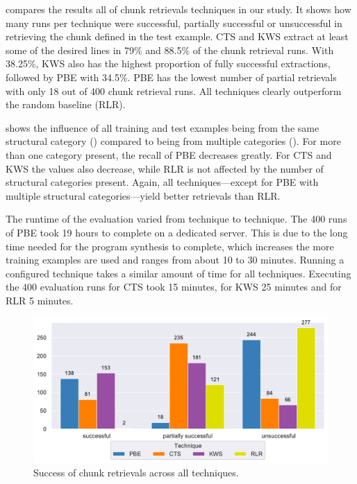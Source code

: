  compares the results all of chunk
retrievals techniques in our study.
It shows how many runs per technique were successful, partially
successful or unsuccessful in retrieving the chunk defined in the
test example.
CTS and KWS
extract at least some of the desired lines in 79\% and 88.5\%
of the chunk retrieval runs.
With 38.25\%, KWS also has the highest proportion of fully
successful extractions, followed by PBE with 34.5\%.
PBE has the
lowest number of partial retrievals with only 18 out of 400 chunk
retrieval runs.
All techniques clearly outperform the random baseline (RLR).

shows the influence of all training and test examples being from the
same structural category
()
compared to being from multiple categories
().
For more
than one category present, the recall of PBE decreases greatly.
For CTS and KWS the values also decrease, while RLR is not affected by
the number of structural categories present.
Again, all techniques---except for PBE with multiple structural
categories---yield better retrievals than RLR.

The runtime of the evaluation varied from technique to technique.
The 400 runs of PBE took 19 hours to complete on a dedicated server.
This is due to the long time needed for the program synthesis to
complete, which increases the more training examples are used and
ranges from about 10 to 30 minutes.
Running a configured technique takes a similar amount of time for all
techniques.
Executing the 400 evaluation runs for CTS took 15 minutes, for KWS 25
minutes and for RLR 5 minutes.

\begin{figure}[!t]
		\centering
		\includegraphics[width=0.8\columnwidth,
		clip]{img/big-study/success-partial-all.pdf}
		\caption{Success of chunk retrievals across all
		techniques.}
		\label{fig:success-partial-all}
\end{figure}


